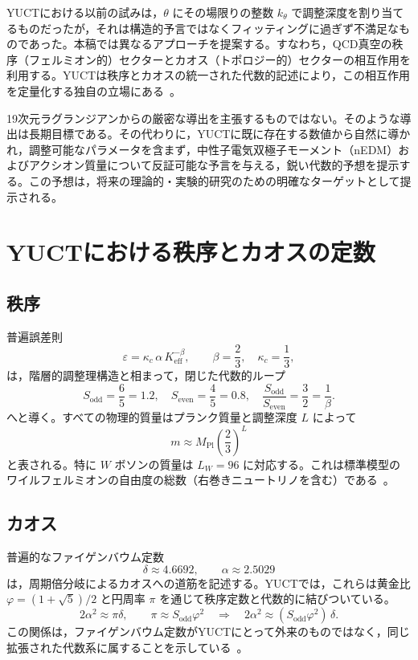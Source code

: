 \documentclass[11pt,a4paper]{article}
\begin{document}
	YUCTにおける以前の試みは，\(\theta\) にその場限りの整数 \(k_\theta\) で調整深度を割り当てるものだったが，それは構造的予言ではなくフィッティングに過ぎず不満足なものであった。本稿では異なるアプローチを提案する。すなわち，QCD真空の秩序（フェルミオン的）セクターとカオス（トポロジー的）セクターの相互作用を利用する。YUCTは秩序とカオスの統一された代数的記述により，この相互作用を定量化する独自の立場にある~\cite{Y2,Feig}。
	
	19次元ラグランジアンからの厳密な導出を主張するものではない。そのような導出は長期目標である。その代わりに，YUCTに既に存在する数値から自然に導かれ，調整可能なパラメータを含まず，中性子電気双極子モーメント（nEDM）およびアクシオン質量について反証可能な予言を与える，鋭い代数的予想を提示する。この予想は，将来の理論的・実験的研究のための明確なターゲットとして提示される。
	
	\section{YUCTにおける秩序とカオスの定数}
	\label{sec:oc}
	
	\subsection{秩序}
	普遍誤差則
	\[
	\varepsilon = \kappa_c\,\alpha\,K_{\mathrm{eff}}^{-\beta},\qquad \beta = \frac{2}{3},\quad \kappa_c = \frac{1}{3},
	\]
	は，階層的調整理構造と相まって，閉じた代数的ループ
	\[
	S_{\mathrm{odd}} = \frac{6}{5} = 1.2,\quad S_{\mathrm{even}} = \frac{4}{5} = 0.8,\quad 
	\frac{S_{\mathrm{odd}}}{S_{\mathrm{even}}} = \frac{3}{2} = \frac{1}{\beta}.
	\]
	へと導く。すべての物理的質量はプランク質量と調整深度 \(L\) によって
	\[
	m \approx M_{\mathrm{Pl}}\left(\frac{2}{3}\right)^L
	\]
	と表される。特に \(W\) ボソンの質量は \(L_W = 96\) に対応する。これは標準模型のワイルフェルミオンの自由度の総数（右巻きニュートリノを含む）である~\cite{Y3}。
	
	\subsection{カオス}
	普遍的なファイゲンバウム定数
	\[
	\delta \approx 4.6692,\qquad \alpha \approx 2.5029
	\]
	は，周期倍分岐によるカオスへの道筋を記述する。YUCTでは，これらは黄金比 \(\varphi = (1+\sqrt{5})/2\) と円周率 \(\pi\) を通じて秩序定数と代数的に結びついている。
	\[
	2\alpha^2 \approx \pi\delta,\qquad
	\pi \approx S_{\mathrm{odd}}\varphi^2 \quad \Longrightarrow \quad 
	2\alpha^2 \approx (S_{\mathrm{odd}}\varphi^2)\,\delta .
	\]
	この関係は，ファイゲンバウム定数がYUCTにとって外来のものではなく，同じ拡張された代数系に属することを示している~\cite{Y2}。
	
\end{document}
